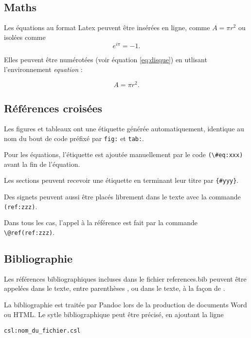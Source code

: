 \documentclass[fleqn,10pt]{ArtEcoFoG} %
\begin{document}
\subsection{Maths}\label{maths}

Les équations au format Latex peuvent être insérées en ligne, comme
\(A=\pi r^2\) ou isolées comme \[e^{i \pi} = -1.\]

Elles peuvent être numérotées (voir équation \eqref{eq:disque}) en
utlisant l'environnement \emph{equation} :

\begin{equation}
A = \pi r^2.
\label{eq:disque}
\end{equation}

\subsection{Références croisées}\label{references-croisees}

Les figures et tableaux ont une étiquette générée automatiquement,
identique au nom du bout de code préfixé par \texttt{fig:} et
\texttt{tab:}.

Pour les équations, l'étiquette est ajoutée manuellement par le code
\texttt{(\textbackslash{}\#eq:xxx)} avant la fin de l'équation.

Les sections peuvent recevoir une étiquette en terminant leur titre par
\texttt{\{\#yyy\}}.

Des signets peuvent aussi être placés librement dans le texte avec la
commande \texttt{(ref:zzz)}.

Dans tous les cas, l'appel à la référence est fait par la commande
\texttt{\textbackslash{}@ref(ref:zzz)}.

\subsection{Bibliographie}\label{bibliographie}

Les références bibliographiques incluses dans le fichier references.bib
peuvent être appelées dans le texte, entre parenthèses
\citep{Marcon2014c}, ou dans le texte, à la façon de
\citet{Marcon2014c}.

La bibliographie est traitée par Pandoc lors de la production de
documents Word ou HTML. Le sytle bibliographique peut être précisé, en
ajoutant la ligne

\begin{verbatim}
csl:nom_du_fichier.csl
\end{verbatim}
\end{document}
